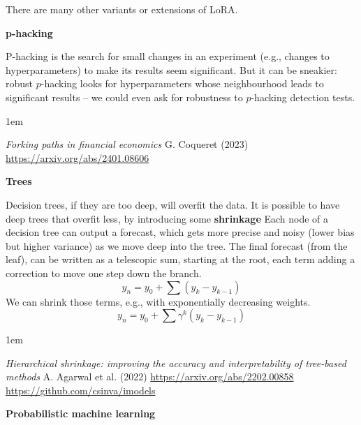 \documentclass[a5paper]{article}
\let\d\textbf
\newenvironment{reference}{%
  \medskip\goodbreak
  \parskip 0pt
  \raggedright
  \leftskip 1em
  \obeylines
}{\par\medskip\goodbreak}
\def\section#1{\clearpage{\vspace*{0cm}\LARGE\centering\bfseries #1\par\bigskip\bigskip}}
\def\subsection#1{{\par\bigskip\goodbreak\large\bfseries #1\par}}
\begin{document}
There are many other variants or extensions of LoRA.
  
\subsection{p-hacking}

P-hacking is the search for small changes in an experiment
(e.g., changes to hyperparameters) to make its results seem significant.
But it can be sneakier:
robust $p$-hacking looks for hyperparameters whose neighbourhood leads to significant results --
we could even ask for robustness to $p$-hacking detection tests.

\begin{reference}
  \emph{Forking paths in financial economics}
  G. Coqueret (2023)
  \url{https://arxiv.org/abs/2401.08606}
\end{reference}

\subsection{Trees}

Decision trees, if they are too deep, will overfit the data.
It is possible to have deep trees that overfit less,
by introducing some \d{shrinkage}
Each node of a decision tree can output a forecast,
which gets more precise and noisy (lower bias but higher variance)
as we move deep into the tree.
The final forecast (from the leaf), can be written as a telescopic sum,
starting at the root, each term adding a correction to move one step down the branch.
\[
y_n = y_0 + \sum ( y_k - y_{k-1} )
\]
We can shrink those terms, e.g., with exponentially decreasing weights.
\[ 
y_n = y_0 + \sum \gamma^k ( y_k - y_{k-1} )
\]

\begin{reference}
  \emph{Hierarchical shrinkage: improving the accuracy and interpretability of tree-based methods}
  A. Agarwal et al. (2022)
  \url{https://arxiv.org/abs/2202.00858}
  \url{https://github.com/csinva/imodels}
\end{reference}

\section{Books and tutorials}
\subsection{Probabilistic machine learning}
\end{document}
